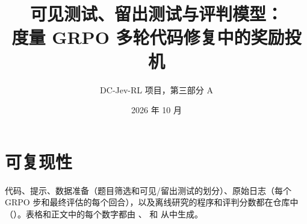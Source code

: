 \documentclass[11pt]{ctexart}
\title{可见测试、留出测试与评判模型：\\度量 GRPO 多轮代码修复中的奖励投机}
\author{DC-Jev-RL 项目，第三部分 A}
\date{2026 年 10 月}
\begin{document}
\maketitle

\begin{abstract}

\end{abstract}







\section*{可复现性}
代码、提示、数据准备（题目筛选和可见/留出测试的划分）、原始日志（每个 GRPO 步和最终评估的每个回合），以及离线研究的程序和评判分数都在仓库中（）。表格和正文中的每个数字都由 、 和  从中生成。



\end{document}

